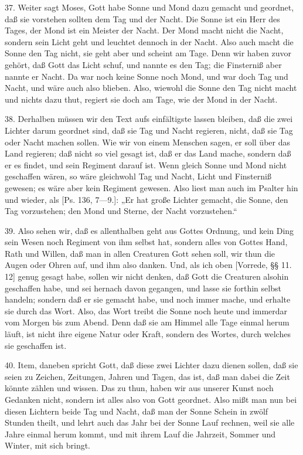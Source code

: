 37. Weiter sagt Moses, Gott habe Sonne und Mond dazu gemacht und geordnet, daß sie vorstehen sollten dem Tag und der Nacht. Die Sonne ist ein Herr des Tages, der Mond ist ein Meister der Nacht. Der Mond macht nicht die Nacht, sondern sein Licht geht und leuchtet dennoch in der Nacht. Also auch macht die Sonne den Tag nicht, sie geht aber und scheint am Tage. Denn wir haben zuvor gehört, daß Gott das Licht schuf, und nannte es den Tag; die Finsterniß aber nannte er Nacht. Da war noch keine Sonne noch Mond, und war doch Tag und Nacht, und wäre auch also blieben. Also, wiewohl die Sonne den Tag nicht macht und nichts dazu thut, regiert sie doch am Tage, wie der Mond in der Nacht.

38. Derhalben müssen wir den Text aufs einfältigste lassen bleiben, daß die zwei Lichter darum geordnet sind, daß sie Tag und Nacht regieren, nicht, daß sie Tag oder Nacht machen sollen. Wie wir von einem Menschen sagen, er soll über das Land regieren; daß nicht so viel gesagt ist, daß er das Land mache, sondern daß er es findet, und sein Regiment darauf ist. Wenn gleich Sonne und Mond nicht geschaffen wären, so wäre gleichwohl Tag und Nacht, Licht und Finsterniß gewesen; es wäre aber kein Regiment gewesen. Also liest man auch im Psalter hin und wieder, als [Ps. 136, 7—9.]: „Er hat große Lichter gemacht, die Sonne, den Tag vorzustehen; den Mond und Sterne, der Nacht vorzustehen.“

39. Also sehen wir, daß es allenthalben geht aus Gottes Ordnung, und kein Ding sein Wesen noch Regiment von ihm selbst hat, sondern alles von Gottes Hand, Rath und Willen, daß man in allen Creaturen Gott sehen soll, wir thun die Augen oder Ohren auf, und ihm also danken. Und, als ich oben [Vorrede, §§ 11. 12] genug gesagt habe, sollen wir nicht denken, daß Gott die Creaturen alsohin geschaffen habe, und sei hernach davon gegangen, und lasse sie forthin selbst handeln; sondern daß er sie gemacht habe, und noch immer mache, und erhalte sie durch das Wort. Also, das Wort treibt die Sonne noch heute und immerdar vom Morgen bis zum Abend. Denn daß sie am Himmel alle Tage einmal herum läuft, ist nicht ihre eigene Natur oder Kraft, sondern des Wortes, durch welches sie geschaffen ist.

40. Item, daneben spricht Gott, daß diese zwei Lichter dazu dienen sollen, daß sie seien zu Zeichen, Zeitungen, Jahren und Tagen, das ist, daß man dabei die Zeit könnte zählen und wissen. Das zu thun, haben wir aus unserer Kunst noch Gedanken nicht, sondern ist alles also von Gott geordnet. Also mißt man nun bei diesen Lichtern beide Tag und Nacht, daß man der Sonne Schein in zwölf Stunden theilt, und lehrt auch das Jahr bei der Sonne Lauf rechnen, weil sie alle Jahre einmal herum kommt, und mit ihrem Lauf die Jahrzeit, Sommer und Winter, mit sich bringt.


